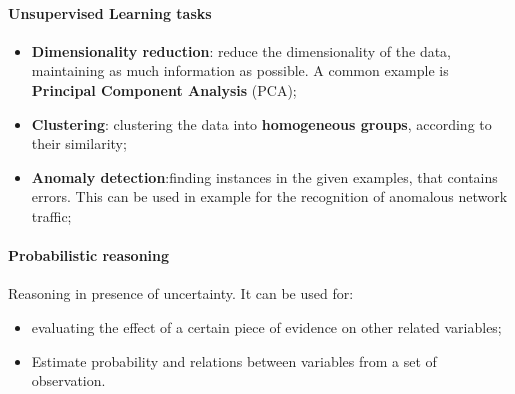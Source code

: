 \paragraph{Unsupervised Learning tasks}
\begin{itemize}
    \item \textbf{Dimensionality reduction}: reduce the dimensionality of the data, maintaining as much information as possible. 
    A common example is \textbf{Principal Component Analysis} (PCA);
    \item \textbf{Clustering}: clustering the data into \textbf{homogeneous groups}, according to their similarity;
    \item \textbf{Anomaly detection}:finding instances in the given examples, that contains errors. This can be used in example for the recognition of anomalous network traffic;
\end{itemize}

\paragraph{Probabilistic reasoning}
Reasoning in presence of uncertainty. It can be used for:
\begin{itemize}
    \item evaluating the effect of a certain piece of evidence on other related variables;
    \item Estimate probability and relations between variables from a set of observation.
\end{itemize}

